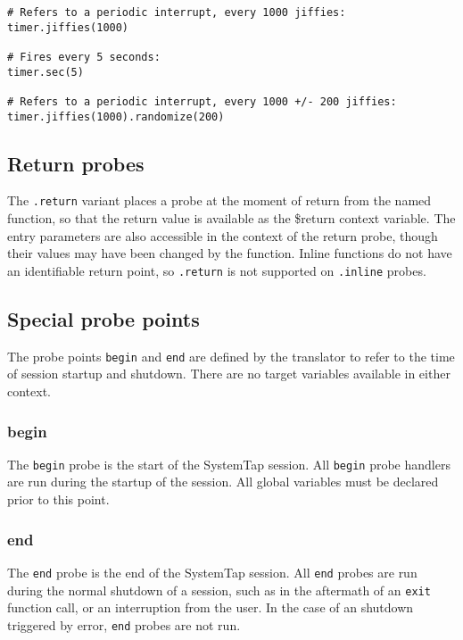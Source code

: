 \documentclass[twoside,english]{article}
\newenvironment{vindent}
{\begin{list}{}{\setlength{\listparindent}{6pt}}
\item[]}
{\end{list}}
\begin{document}
\begin{vindent}
\begin{verbatim}
# Refers to a periodic interrupt, every 1000 jiffies:
timer.jiffies(1000)

# Fires every 5 seconds:
timer.sec(5)

# Refers to a periodic interrupt, every 1000 +/- 200 jiffies:
timer.jiffies(1000).randomize(200)
\end{verbatim}
\end{vindent}

\subsection{Return probes}
The \texttt{.return} variant places a probe at the moment of return from
the named function, so that the return value is available as the \$return
context variable. The entry parameters are also accessible in the context
of the return probe, though their values may have been changed by the function.
Inline functions do not have an identifiable return point, so \texttt{.return}
is not supported on \texttt{.inline} probes.


\subsection{Special probe points}

The probe points \texttt{begin} and \texttt{end} are defined by the translator
to refer to the time of session startup and shutdown. There are no target
variables available in either context.


\subsubsection{begin}
The \texttt{begin} probe is the start of the SystemTap session. All \texttt{begin}
probe handlers are run during the startup of the session. All global variables
must be declared prior to this point.


\subsubsection{end}
The \texttt{end} probe is the end of the SystemTap session. All \texttt{end}
probes are run during the normal shutdown of a session, such as in the aftermath
of an \texttt{exit} function call, or an interruption from the user. In the
case of an shutdown triggered by error, \texttt{end} probes are not run.
\end{document}
